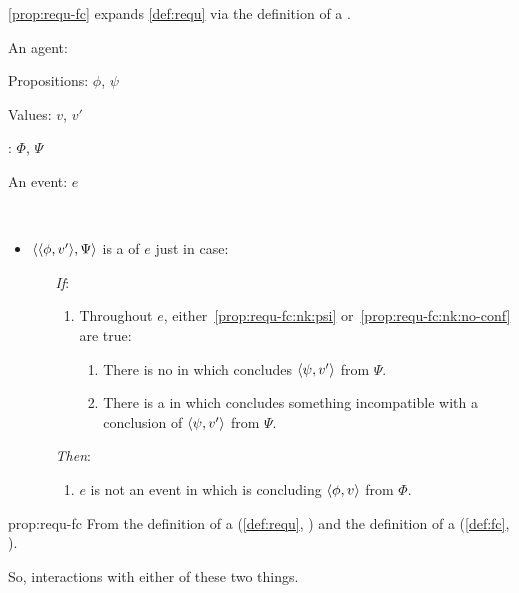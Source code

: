 \begin{note}
  \autoref{prop:requ-fc} expands \autoref{def:requ} via the definition of a \fc{}.

  \begin{proposition}
    \label{prop:requ-fc}
    \begin{itemize*}[noitemsep, label=\(\circ\)]
    \item
      An agent: \vAgent{}
    \item
      Propositions: \(\phi\), \(\psi\)
    \item
      Values: \(v\), \(v'\)
    \item
      : \(\Phi\), \(\Psi\)
    \item
      An event: \(e\)
    \item
      \mbox{ }
    \end{itemize*}

    \begin{itemize}
    \item
      \(\langle \langle \phi, v' \rangle, \Psi \rangle\) is a \emph{\requ{}} of \(e\) just in case:
      \begin{itemize}
      \item[\emph{If}:]
        \begin{enumerate}[label=\alph*., ref=(\alph*), series=requDefSeries]
        \item
          \label{prop:requ-fc:nk}
          Throughout \(e\), either~\ref{prop:requ-fc:nk:psi} or~\ref{prop:requ-fc:nk:no-conf} are true:
          \begin{enumerate}[label=\roman*., ref=(\roman*)]
          \item
            \label{prop:requ-fc:nk:psi}
            There is no \pevent{} in which \vAgent{} concludes \(\langle \psi, v' \rangle\) from \(\Psi\).
          \item
            \label{prop:requ-fc:nk:no-conf}
            There is a \pevent{} in which \vAgent{} concludes something incompatible with a conclusion of \(\langle \psi, v' \rangle\) from \(\Psi\).
          \end{enumerate}
        \end{enumerate}
      \item[\emph{Then}:]
        \begin{enumerate}[label=\alph*., ref=(\alph*), resume*=requDefSeries]
        \item
          \label{prop:requ-fc:ne}
          \(e\) is not an event in which \vAgent{} is concluding \(\langle \phi, v \rangle\) from \(\Phi\).
        \end{enumerate}
      \end{itemize}
    \end{itemize}
    \vspace{-\baselineskip}
  \end{proposition}

  \begin{argument}{prop:requ-fc}
    From the definition of a \requ{} (\autoref{def:requ}, ) and the definition of a \fc{} (\autoref{def:fc}, ).
  \end{argument}
  So, interactions with either of these two things.
\end{note}


